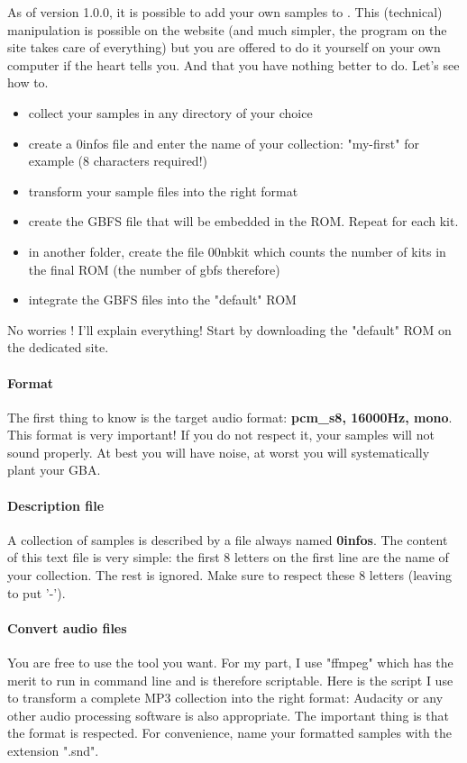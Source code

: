\label{sec:addsamples}

As of version 1.0.0, it is possible to add your own samples to \FAT.
This (technical) manipulation is possible on the website (and much simpler, the program on the site takes care of everything)
but you are offered to do it yourself on your own computer if the heart tells you. And that you have nothing better to do.
Let's see how to.
\medskip

\begin{itemize}
  \item{collect your samples in any directory of your choice}
  \item{create a 0infos file and enter the name of your collection: "my-first" for example (8 characters required!) }
  \item{transform your sample files into the right format}
  \item{create the GBFS file that will be embedded in the ROM. Repeat for each kit.}
  \item{in another folder, create the file 00nbkit which counts the number of kits in the final ROM (the number of gbfs therefore)}
  \item{integrate the GBFS files into the "default" ROM}
\end{itemize}\medskip

No worries ! I'll explain everything!
Start by downloading the "default" ROM on the dedicated site.

\paragraph{Format} The first thing to know is the target audio format: {\bf pcm\_s8, 16000Hz, mono}.
This format is very important! If you do not respect it, your samples will not sound properly.
At best you will have noise, at worst you will systematically plant your GBA.

\paragraph{Description file} A collection of samples is described by a file always named {\bf 0infos}.
The content of this text file is very simple: the first 8 letters on the first line are the name of your collection.
The rest is ignored. Make sure to respect these 8 letters (leaving to put '-').

\paragraph{Convert audio files} You are free to use the tool you want.
For my part, I use "ffmpeg" which has the merit to run in command line and is therefore scriptable.
Here is the script I use to transform a complete MP3 collection into the right format:
Audacity or any other audio processing software is also appropriate.
The important thing is that the format is respected.
For convenience, name your formatted samples with the extension ".snd".

